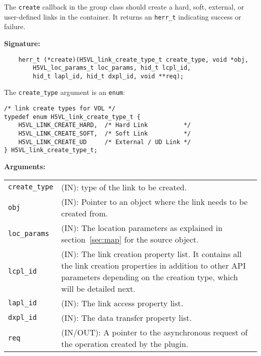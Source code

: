 The {\tt create} callback in the group class should create a hard,
soft, external, or user-defined links in the container. It returns an
{\tt herr\_t} indicating success or failure.

\textbf{Signature:}
\begin{lstlisting}
    herr_t (*create)(H5VL_link_create_type_t create_type, void *obj,
        H5VL_loc_params_t loc_params, hid_t lcpl_id, 
        hid_t lapl_id, hid_t dxpl_id, void **req);
\end{lstlisting}

The {\tt create\_type} argument is an {\tt enum}:
\begin{lstlisting}
/* link create types for VOL */
typedef enum H5VL_link_create_type_t {
    H5VL_LINK_CREATE_HARD,  /* Hard Link          */
    H5VL_LINK_CREATE_SOFT,  /* Soft Link          */
    H5VL_LINK_CREATE_UD     /* External / UD Link */
} H5VL_link_create_type_t;
\end{lstlisting}

\textbf{Arguments:}\\
\begin{tabular}{l p{10cm}}
  {\tt create\_type} & (IN): type of the link to be created.\\
  {\tt obj} & (IN): Pointer to an object where the link needs to be
  created from.\\
  {\tt loc\_params} & (IN): The location parameters as explained in
  section~\ref{sec:map} for the source object. \\
  {\tt lcpl\_id} & (IN): The link creation property list. It contains
  all the link creation properties in addition to other API parameters
  depending on the creation type, which will be detailed next.\\
  {\tt lapl\_id} & (IN): The link access property list.\\
  {\tt dxpl\_id} & (IN): The data transfer property list.\\
  {\tt req} & (IN/OUT): A pointer to the asynchronous request of the
  operation created by the plugin.\\
\end{tabular}

